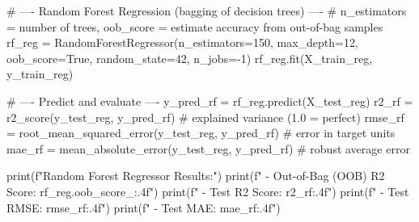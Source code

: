 \begin{codebox}[title={Random Forest Regression (bagging of decision trees)}]
# ---- Random Forest Regression (bagging of decision trees) ----
# n_estimators = number of trees, oob_score = estimate accuracy from out-of-bag samples
rf_reg = RandomForestRegressor(n_estimators=150, max_depth=12, oob_score=True, random_state=42, n_jobs=-1)
rf_reg.fit(X_train_reg, y_train_reg)

# ---- Predict and evaluate ----
y_pred_rf = rf_reg.predict(X_test_reg)
r2_rf = r2_score(y_test_reg, y_pred_rf)                          # explained variance (1.0 = perfect)
rmse_rf = root_mean_squared_error(y_test_reg, y_pred_rf)         # error in target units
mae_rf = mean_absolute_error(y_test_reg, y_pred_rf)              # robust average error

print(f"Random Forest Regressor Results:")
print(f" - Out-of-Bag (OOB) R2 Score: {rf_reg.oob_score_:.4f}")
print(f" - Test R2 Score:              {r2_rf:.4f}")
print(f" - Test RMSE:                  {rmse_rf:.4f}")
print(f" - Test MAE:                   {mae_rf:.4f}")
\end{codebox}

